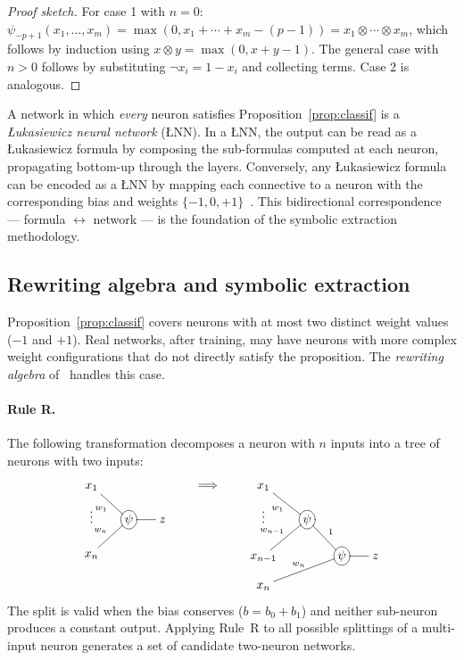 \documentclass[10pt,a4paper,twoside]{article}
\newcommand{\tnorm}{\otimes}      %
\newcommand{\LNN}{\L{}NN}
\begin{document}
\begin{proof}[Proof sketch]
For case 1 with $n=0$: $\psi_{-p+1}(x_1,\ldots,x_m)
= \max(0, x_1+\cdots+x_m - (p-1)) = x_1 \tnorm \cdots \tnorm x_m$,
which follows by induction using $x \tnorm y = \max(0,x+y-1)$.
The general case with $n > 0$ follows by substituting $\neg x_i = 1 - x_i$
and collecting terms.
Case 2 is analogous.
\end{proof}

A network in which \emph{every} neuron satisfies Proposition~\ref{prop:classif}
is a \emph{\L{}ukasiewicz neural network} (\LNN{}).
In a \LNN{}, the output can be read as a \L{}ukasiewicz formula by composing
the sub-formulas computed at each neuron, propagating bottom-up through the
layers.
Conversely, any \L{}ukasiewicz formula can be encoded as a \LNN{} by mapping
each connective to a neuron with the corresponding bias and weights
$\{-1, 0, +1\}$~\cite{amato2002}.
This bidirectional correspondence --- formula $\leftrightarrow$ network ---
is the foundation of the symbolic extraction methodology.

\subsection{Rewriting algebra and symbolic extraction}
\label{ssec:rewriting}

Proposition~\ref{prop:classif} covers neurons with at most two distinct weight
values ($-1$ and $+1$).
Real networks, after training, may have neurons with more complex weight
configurations that do not directly satisfy the proposition.
The \emph{rewriting algebra} of~\cite{leandro2009} handles this case.

\paragraph{Rule R.}
The following transformation decomposes a neuron with $n$ inputs into a tree
of neurons with two inputs:
\[
\xymatrix @R=10pt @C=15pt {
  x_1 \ar@{-}[dr]_{w_1} & \\
  \vdots & *+[o][F-]{\psi} \ar@{-}[r] & z \\
  x_n \ar@{-}[ur]^{w_n} &
}
\qquad \Longrightarrow \qquad
\xymatrix @R=10pt @C=15pt {
  x_1 \ar@{-}[dr]_{w_1} & \\
  \vdots & *+[o][F-]{\psi} \ar@{-}[rd]^{1} & \\
  x_{n-1} \ar@{-}[ur]^{w_{n-1}} & & *+[o][F-]{\psi} \ar@{-}[r] & z \\
  x_n \ar@{-}[rru]^{w_n} & &
}
\]
The split is valid when the bias conserves ($b = b_0 + b_1$) and neither
sub-neuron produces a constant output.
Applying Rule~R to all possible splittings of a multi-input neuron generates
a set of candidate two-neuron networks.
\end{document}

